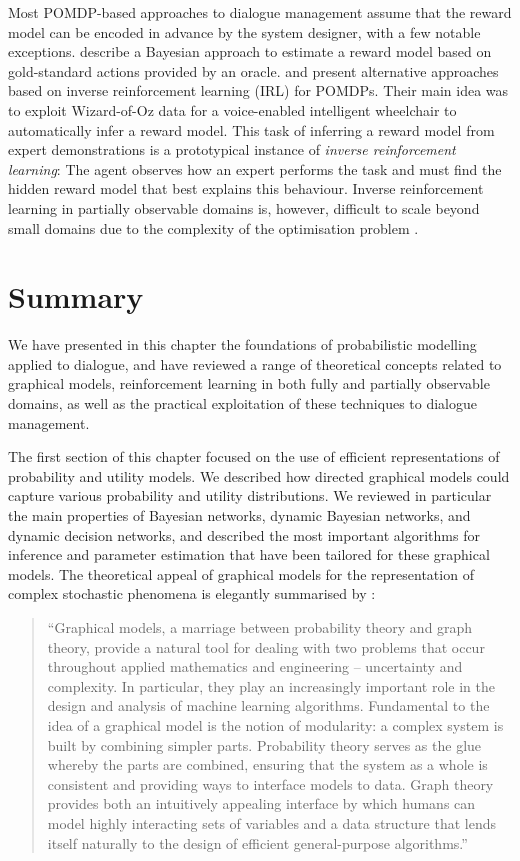 Most POMDP-based approaches to dialogue management assume that the reward model can be encoded in advance by the system designer, with a few notable exceptions. \cite{DBLP:conf/iui/AtrashP09} describe a Bayesian approach to estimate a reward model based on gold-standard actions provided by an oracle. \cite{boularias2010} and \cite{ChinaeiC12} present alternative approaches based on inverse reinforcement learning (IRL) for POMDPs. Their main idea was to exploit Wizard-of-Oz data for a voice-enabled intelligent wheelchair to automatically infer a reward model.  This task of inferring a reward model from expert demonstrations is a prototypical instance of \textit{inverse reinforcement learning}: The agent observes how an expert performs the task and must find the hidden reward model that best explains this behaviour.  Inverse reinforcement learning in partially observable domains is, however, difficult to scale beyond small domains due to the complexity of the optimisation problem \citep{Choi:2011}. 

\section{Summary}

We have presented in this chapter the foundations of probabilistic modelling applied to dialogue, and have reviewed a range of theoretical concepts related to graphical models, reinforcement learning in both fully and partially observable domains, as well as the practical exploitation of these techniques to dialogue management. 

The first section of this chapter focused on the use of efficient representations of probability and utility models.  We described how directed graphical models could capture various probability and utility distributions. We reviewed in particular the main properties of Bayesian networks, dynamic Bayesian networks, and dynamic decision networks, and described the most important algorithms for inference and parameter estimation that have been tailored for these graphical models. The theoretical appeal of graphical models for the representation of complex stochastic phenomena is elegantly summarised by \citet[][p. 1]{jordan1998}: 
\begin{quote}
 ``Graphical models, a marriage between probability theory and graph theory, provide a natural tool for dealing with two problems that occur throughout applied mathematics and engineering -- uncertainty and complexity. In particular, they play an increasingly important role in the design and analysis of machine learning algorithms. Fundamental to the idea of a graphical model is the notion of modularity: a complex system is built by combining simpler parts. Probability theory serves as the glue whereby the parts are combined, ensuring that the system as a whole is consistent and providing ways to interface models to data. Graph theory provides both an intuitively appealing interface by which humans can model highly interacting sets of variables and a data structure that lends itself naturally to the design of efficient general-purpose algorithms.''
 \end{quote}

